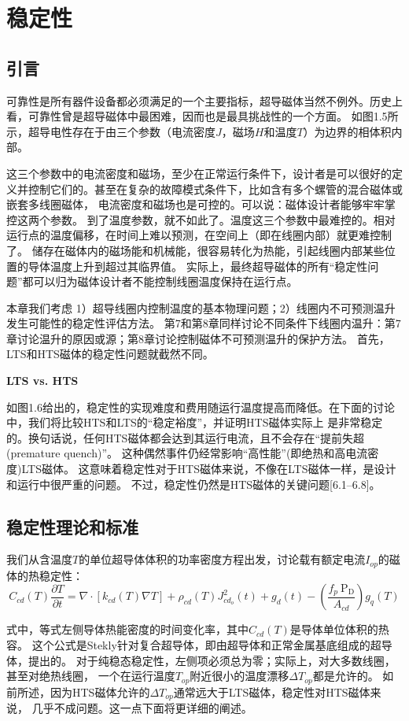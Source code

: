 \chapter{稳定性}
\section{引言}
可靠性是所有器件设备都必须满足的一个主要指标，超导磁体当然不例外。历史上看，可靠性曾是超导磁体中最困难，因而也是最具挑战性的一个方面。
如图1.5所示，超导电性存在于由三个参数（电流密度$J$，磁场$H$和温度$T$）为边界的相体积内部。

这三个参数中的电流密度和磁场，至少在正常运行条件下，设计者是可以很好的定义并控制它们的。甚至在复杂的故障模式条件下，比如含有多个螺管的混合磁体或嵌套多线圈磁体，
电流密度和磁场也是可控的。可以说：磁体设计者能够牢牢掌控这两个参数。
到了温度参数，就不如此了。温度这三个参数中最难控的。相对运行点的温度偏移，在时间上难以预测，在空间上（即在线圈内部）就更难控制了。
储存在磁体内的磁场能和机械能，很容易转化为热能，引起线圈内部某些位置的导体温度上升到超过其临界值。
实际上，最终超导磁体的所有“稳定性问题”都可以归为磁体设计者不能控制线圈温度保持在运行点。

本章我们考虑 1）超导线圈内控制温度的基本物理问题；2）线圈内不可预测温升发生可能性的稳定性评估方法。
第7和第8章同样讨论不同条件下线圈内温升：第7章讨论温升的原因或源；第8章讨论控制磁体不可预测温升的保护方法。
首先，LTS和HTS磁体的稳定性问题就截然不同。

\textbf{LTS vs. HTS}

如图1.6给出的，稳定性的实现难度和费用随运行温度提高而降低。在下面的讨论中，我们将比较HTS和LTS的“稳定裕度”，并证明HTS磁体实际上
是非常稳定的。换句话说，任何HTS磁体都会达到其运行电流，且不会存在“提前失超(premature quench)”。
这种偶然事件仍经常影响“高性能”(即绝热和高电流密度)LTS磁体。
这意味着稳定性对于HTS磁体来说，不像在LTS磁体一样，是设计和运行中很严重的问题。
不过，稳定性仍然是HTS磁体的关键问题[6.1–6.8]。

\section{稳定性理论和标准}
我们从含温度$T$的单位超导体体积的功率密度方程出发，讨论载有额定电流$I_{op}$的磁体的热稳定性：
\begin{equation}
C_{cd}(T)\frac{\partial T}{\partial t}=\nabla ·[k_{cd}(T)\nabla T]+\rho_{cd}(T)J_{cd_o}^2(t)+g_d(t)-(\frac{f_p\ \mathrm{P_D}}{A_{cd}})g_q(T)
\end{equation}

式中，等式左侧导体热能密度的时间变化率，其中$C_{cd}(T)$是导体单位体积的热容。
这个公式是Stekly针对复合超导体，即由超导体和正常金属基底组成的超导体，提出的。
对于纯稳态稳定性，左侧项必须总为零；实际上，对大多数线圈，甚至对绝热线圈，
一个在运行温度$T_{op}$附近很小的温度漂移$\Delta T_{op}$都是允许的。
如前所述，因为HTS磁体允许的$\Delta T_{op}$通常远大于LTS磁体，稳定性对HTS磁体来说，
几乎不成问题。这一点下面将更详细的阐述。

